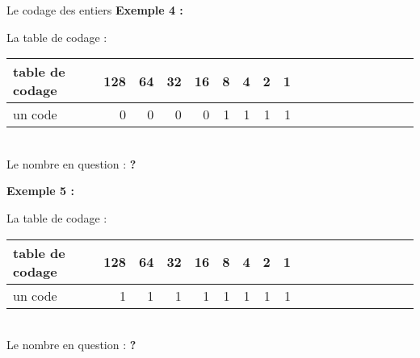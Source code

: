\begin{frame}{Le codage des entiers}
    \textbf{Exemple 4 :}
    \begin{center}
        La table de codage : \\
        $\;$\\
        \begin{tabular}{|*{2}{l||r|r|r|r|r|r|r|r|}}
            \hline
                table de codage & 128 & 64 & 32 & 16 & 8 & 4 & 2 & 1 \\
            \hline
                un code         & 0   & 0  & 0  & 0  & 1 & 1 & 1 & 1 \\
            \hline
        \end{tabular} \\
        $\;$\\
        Le nombre en question : \textbf{?} \\
    \end{center}
    \textbf{Exemple 5 :}
    \begin{center}
        La table de codage : \\
        $\;$\\
        \begin{tabular}{|*{2}{l||r|r|r|r|r|r|r|r|}}
            \hline
                table de codage & 128 & 64 & 32 & 16 & 8 & 4 & 2 & 1 \\
            \hline
                un code         & 1   & 1  & 1  & 1  & 1 & 1 & 1 & 1 \\
            \hline
        \end{tabular} \\
        $\;$\\
        Le nombre en question : \textbf{?} \\
    \end{center}
\end{frame}

